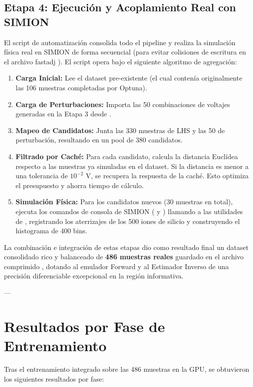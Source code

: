 \documentclass[12pt,letterpaper]{article}
\begin{document}
\subsection{Etapa 4: Ejecución y Acoplamiento Real con SIMION}
El script de automatización  consolida todo el pipeline y realiza la simulación física real en SIMION de forma secuencial (para evitar colisiones de escritura en el archivo fastadj ).
El script opera bajo el siguiente algoritmo de agregación:
\begin{enumerate}
    \item \textbf{Carga Inicial:} Lee el dataset pre-existente  (el cual contenía originalmente las 106 muestras completadas por Optuna).
    \item \textbf{Carga de Perturbaciones:} Importa las 50 combinaciones de voltajes generadas en la Etapa 3 desde .
    \item \textbf{Mapeo de Candidatos:} Junta las 330 muestras de LHS y las 50 de perturbación, resultando en un pool de 380 candidatos.
    \item \textbf{Filtrado por Caché:} Para cada candidato, calcula la distancia Euclídea respecto a las muestras ya simuladas en el dataset. Si la distancia es menor a una tolerancia de $10^{-2}\text{ V}$, se recupera la respuesta de la caché. Esto optimiza el presupuesto y ahorra tiempo de cálculo.
    \item \textbf{Simulación Física:} Para los candidatos nuevos (30 muestras en total), ejecuta los comandos de consola de SIMION ( y ) llamando a las utilidades de , registrando los aterrizajes de los 500 iones de silicio y construyendo el histograma de 400 bins.
\end{enumerate}

La combinación e integración de estas etapas dio como resultado final un dataset consolidado rico y balanceado de \textbf{486 muestras reales} guardado en el archivo comprimido , dotando al emulador Forward y al Estimador Inverso de una precisión diferenciable excepcional en la región informativa.


---

\section{Resultados por Fase de Entrenamiento}
Tras el entrenamiento integrado sobre las 486 muestras en la GPU, se obtuvieron los siguientes resultados por fase:
\end{document}
